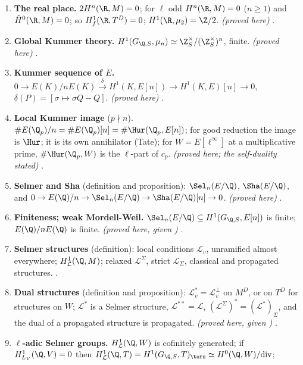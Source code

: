 \begin{sloppypar}
\begin{enumerate}[label=\textbf{\thechapter.\arabic*}]
{Hermite-Minkowski; $H^2$ and $\operatorname{cd}$ stated; reference)} .
\item \textbf{The real place.} $2H^n(\R,M)=0$; for $\ell$ odd $H^n(\R,M)=0$ ($n\ge1$) and $\hat H^0(\R,M)=0$; so $H^1_f(\R,T^D)=0$; $H^1(\R,\mu_2)=\Z/2$. \emph{(proved here)}
.
\item \textbf{Global Kummer theory.} $H^1(G_{\Q,S},\mu_n)\simeq\Z_S^\times/(\Z_S^\times)^n$, finite. \emph{(proved here)} .
\item \textbf{Kummer sequence of $E$.} $0\to E(K)/nE(K)\xrightarrow{\delta}H^1(K,E[n])\to H^1(K,E)[n]\to0$, $\delta(P)=[\sigma\mapsto\sigma Q-Q]$. \emph{(proved here)} .
\item \textbf{Local Kummer image} ($p\nmid n$). $\#E(\Q_p)/n=\#E(\Q_p)[n]=\#\Hur(\Q_p,E[n])$; for good reduction the image is $\Hur$; it is its own annihilator (Tate); for $W=E[\ell^\infty]$ at a
multiplicative prime, $\#\Hur(\Q_p,W)$ is the $\ell$-part of $c_p$. \emph{(proved here; the self-duality stated)} .
\item \textbf{Selmer and Sha} (definition and proposition): $\Sel_n(E/\Q)$, $\Sha(E/\Q)$, and $0\to E(\Q)/n\to\Sel_n(E/\Q)\to\Sha(E/\Q)[n]\to0$. \emph{(proved here)}
.
\item \textbf{Finiteness; weak Mordell-Weil.} $\Sel_n(E/\Q)\subseteq H^1(G_{\Q,S},E[n])$ is finite; $E(\Q)/nE(\Q)$ is finite. \emph{(proved here, given )}
.
\item \textbf{Selmer structures} (definition): local conditions $\mathcal L_v$, unramified almost everywhere; $H^1_{\mathcal L}(\Q,M)$; relaxed $\mathcal L^\Sigma$, strict $\mathcal L_\Sigma$, classical and
propagated structures. .
\item \textbf{Dual structures} (definition and proposition): $\mathcal L^*_v=\mathcal L_v^\perp$ on $M^D$, or on $T^D$ for structures on $W$; $\mathcal L^*$ is a Selmer structure, $\mathcal L^{**}=\mathcal L$,
$(\mathcal L^\Sigma)^*=(\mathcal L^*)_\Sigma$, and the dual of a propagated structure is propagated. \emph{(proved here, given )}
.
\item \textbf{$\ell$-adic Selmer groups.} $H^1_{\mathcal L}(\Q,W)$ is cofinitely generated; if $H^1_{L_V}(\Q,V)=0$ then $H^1_{\mathcal L}(\Q,T)=H^1(G_{\Q,S},T)_{\tors}\simeq H^0(\Q,W)/\mathrm{div}$;

\end{enumerate}
\end{sloppypar}
